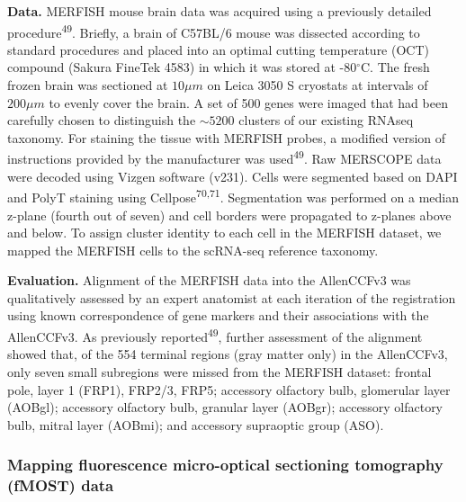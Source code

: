 \documentclass[
  12pt,
]{article}
\begin{document}
\textbf{Data.} MERFISH mouse brain data was acquired using a previously
detailed procedure\textsuperscript{49}. Briefly, a brain of C57BL/6
mouse was dissected according to standard procedures and placed into an
optimal cutting temperature (OCT) compound (Sakura FineTek 4583) in
which it was stored at -80\(^\circ\)C. The fresh frozen brain was
sectioned at \(10 \mu m\) on Leica 3050 S cryostats at intervals of
\(200 \mu m\) to evenly cover the brain. A set of 500 genes were imaged
that had been carefully chosen to distinguish the \({\sim}5200\)
clusters of our existing RNAseq taxonomy. For staining the tissue with
MERFISH probes, a modified version of instructions provided by the
manufacturer was used\textsuperscript{49}. Raw MERSCOPE data were
decoded using Vizgen software (v231). Cells were segmented based on DAPI
and PolyT staining using Cellpose\textsuperscript{70,71}. Segmentation
was performed on a median z-plane (fourth out of seven) and cell borders
were propagated to z-planes above and below. To assign cluster identity
to each cell in the MERFISH dataset, we mapped the MERFISH cells to the
scRNA-seq reference taxonomy.

\textbf{Evaluation.} Alignment of the MERFISH data into the AllenCCFv3
was qualitatively assessed by an expert anatomist at each iteration of
the registration using known correspondence of gene markers and their
associations with the AllenCCFv3. As previously
reported\textsuperscript{49}, further assessment of the alignment showed
that, of the 554 terminal regions (gray matter only) in the AllenCCFv3,
only seven small subregions were missed from the MERFISH dataset:
frontal pole, layer 1 (FRP1), FRP2/3, FRP5; accessory olfactory bulb,
glomerular layer (AOBgl); accessory olfactory bulb, granular layer
(AOBgr); accessory olfactory bulb, mitral layer (AOBmi); and accessory
supraoptic group (ASO).

\subsubsection{Mapping fluorescence micro-optical sectioning tomography
(fMOST)
data}\label{mapping-fluorescence-micro-optical-sectioning-tomography-fmost-data}
\end{document}
